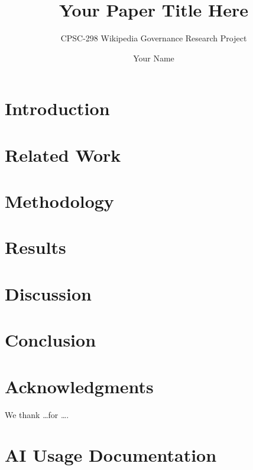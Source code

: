 \documentclass[sigconf,screen]{acmart}
\title{Your Paper Title Here}
\subtitle{CPSC-298 Wikipedia Governance Research Project}
\author{Your Name}
\affiliation{%
  \institution{Your University}
  \city{Your City}
  \country{USA}
}
\begin{document}
\maketitle

\section{Introduction}


\section{Related Work}


\section{Methodology}


\section{Results}


\section{Discussion}


\section{Conclusion}


\section*{Acknowledgments}
We thank \dots for \ldots.




\appendix
\section{AI Usage Documentation}

\end{document}
